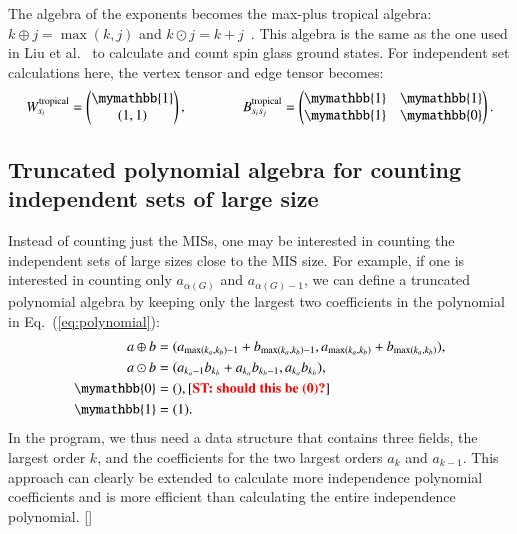 \documentclass[onefignum, onetabnum]{siamart190516}
\newcommand{\<}{\langle}
\renewcommand{\>}{\rangle}
\newcommand{\Eq}[1]{Eq.~(\ref{#1})}
\newcommand{\red}[1]{[{\bf  \color{red}{ST: #1}}]}
\newcounter{example}
\begin{document}
The algebra of the exponents becomes the max-plus tropical algebra: $k \oplus j = \max(k,j)$ and $k \odot j = k + j$~\cite{Maclagan2015, Moore2011}. This algebra is the same as the one used in Liu et al.~\cite{Liu2021} to calculate and count spin glass ground states. For independent set calculations here, the vertex tensor and edge tensor becomes:
\begin{equation}
    W_{s_i}^{\rm tropical} = \left(\begin{matrix}
        \mymathbb{1} \\
        (1,1)
    \end{matrix}\right),   
    \qquad \qquad
        B_{s_i s_j}^{\rm tropical} = \left(\begin{matrix}
        \mymathbb{1}  & \mymathbb{1} \\
        \mymathbb{1} & \mymathbb{0}
    \end{matrix}\right).
\end{equation}

\subsection{Truncated polynomial algebra for counting independent sets of large size}
Instead of counting just the MISs, one may be interested in counting the independent sets of large sizes close to the MIS size. For example, if one is interested in counting only $a_{\alpha(G)}$ and $a_{\alpha(G)-1}$, we can define a truncated polynomial algebra by keeping only the largest two coefficients in the polynomial in \Eq{eq:polynomial}:
\begin{equation}
    \begin{split}
    a \oplus b &= (a_{\max(k_a, k_b)-1} + b_{\max(k_a, k_b)-1}, a_{\max(k_a, k_b)} + b_{\max(k_a, k_b)}),\\
    a \odot b &= (a_{k_a-1} b_{k_b}+a_{k_a} b_{k_b-1}, a_{k_a} b_{k_b}),\\
    \mymathbb{0} &= (), \text{\red{should this be (0)?}}  \\
    \mymathbb{1} &= (1).\label{eq:max2poly}
    \end{split}
\end{equation}
In the program, we thus need a data structure that contains three fields, the largest order $k$, and the coefficients for the two largest orders $a_k$ and $a_{k-1}$. This approach can clearly be extended to calculate more independence polynomial coefficients and is more efficient than calculating the entire independence polynomial. \red{can be used to enumerate suboptimal solution as well?}
\end{document}
